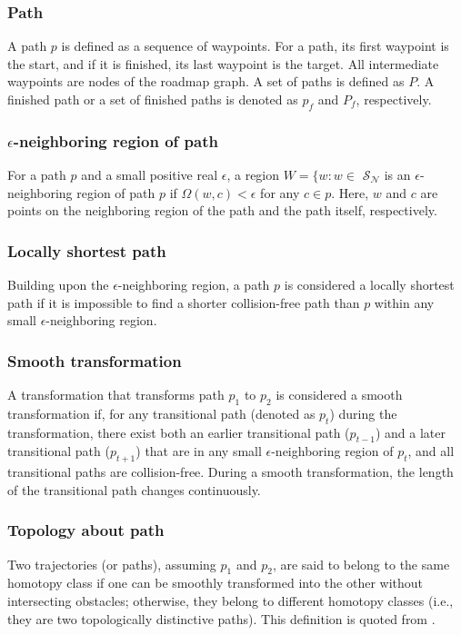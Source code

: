 \documentclass[letterpaper, 10 pt, journal, twoside]{IEEEtran}
\begin{document}

\subsubsection{Path} 

A path $p$ is defined as a sequence of waypoints. For a path, its first waypoint is the start, and if it is finished, its last waypoint is the target. All intermediate waypoints are nodes of the roadmap graph. A set of paths is defined as $P$. A finished path or a set of finished paths is denoted as $p_f$ and $P_f$, respectively.

\subsubsection{$\epsilon$-neighboring region of path \cite{liu1991proposal}}
For a path $p$ and a small positive real $\epsilon$, a region $W=\{w:w \in$ $\mathcal{S}_{\mathcal{N}}$ is an $\epsilon$-neighboring region of path $p$ if $\Omega(w, c) < \epsilon$ for any $c \in p$. Here, $w$ and $c$ are points on the neighboring region of the path and the path itself, respectively. 
\subsubsection{Locally shortest path}
Building upon the $\epsilon$-neighboring region, a path $p$ is considered a locally shortest path if it is impossible to find a shorter collision-free path than $p$ within any small $\epsilon$-neighboring region.

\subsubsection{Smooth transformation}
A transformation that transforms path $p_1$ to $p_2$ is considered a smooth transformation if, for any transitional path (denoted as $p_t$) during the transformation, there exist both an earlier transitional path ($p_{t-1}$) and a later transitional path ($p_{t+1}$) that are in any small $\epsilon$-neighboring region of $p_t$, and all transitional paths are collision-free. During a smooth transformation, the length of the transitional path changes continuously.

\subsubsection{Topology about path}
Two trajectories (or paths), assuming $p_1$ and $p_2$, are said to belong to the same homotopy class if one can be smoothly transformed into the other without intersecting obstacles; otherwise, they belong to different homotopy classes (i.e., they are two topologically distinctive paths). This definition is quoted from \cite{bhattacharya2010search}.
\end{document}
